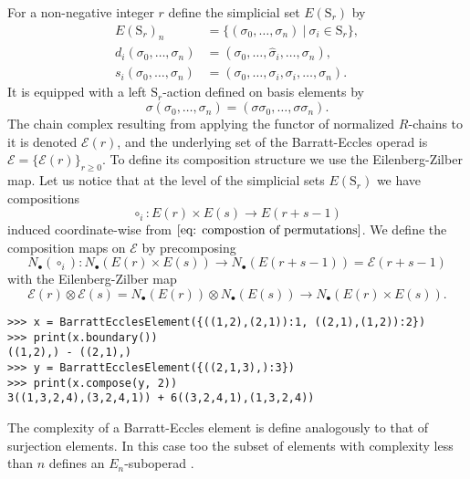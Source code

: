 \documentclass{amsart}
\renewcommand{\S}{\mathrm S}
\begin{document}
For a non-negative integer $r$ define the simplicial set $E(\mathrm S_r)$ by
\begin{align*}
E(\mathrm S_r)_n &= \{ (\sigma_0, \dots, \sigma_n)\ |\ \sigma_i \in \mathrm{S}_r\}, \\
d_i(\sigma_0, \dots, \sigma_n) &= (\sigma_0, \dots, \widehat{\sigma}_i, \dots, \sigma_n), \\
s_i(\sigma_0, \dots, \sigma_n) &= (\sigma_0, \dots, \sigma_i, \sigma_i, \dots, \sigma_n).
\end{align*}
It is equipped with a left $\mathrm S_r$-action defined on basis elements by
\begin{equation*}
\sigma (\sigma_0, \dots, \sigma_n) = (\sigma \sigma_0, \dots, \sigma \sigma_n).
\end{equation*}
The chain complex resulting from applying the functor of normalized $R$-chains to it is denoted $\mathcal E(r)$, and the underlying set of the Barratt-Eccles operad is $\mathcal E = \{\mathcal E(r)\}_{r\geq0}$. To define its composition structure we use the Eilenberg-Zilber map. Let us notice that at the level of the simplicial sets $E(\S_r)$ we have compositions
\begin{equation*}
{\circ}_{i}: E(r) \times E(s) \to E(r + s - 1)
\end{equation*}
induced coordinate-wise from $\eqref{eq: compostion of permutations}$.
We define the composition maps on $\mathcal E$ by precomposing
\begin{equation*}
N_\bullet(\circ_i) \colon N_\bullet(E(r) \times E(s))
\longrightarrow
N_\bullet(E(r + s - 1)) = \mathcal E(r+s-1)
\end{equation*}
with the Eilenberg-Zilber map
\begin{equation*}
\mathcal E(r) \otimes \mathcal E(s) =
N_\bullet(E(r)) \otimes N_\bullet(E(s))
\longrightarrow
N_\bullet(E(r) \times E(s)).
\end{equation*}
\begin{Verbatim}[frame=single]
>>> x = BarrattEcclesElement({((1,2),(2,1)):1, ((2,1),(1,2)):2})
>>> print(x.boundary())
((1,2),) - ((2,1),)
>>> y = BarrattEcclesElement({((2,1,3),):3})
>>> print(x.compose(y, 2))
3((1,3,2,4),(3,2,4,1)) + 6((3,2,4,1),(1,3,2,4))
\end{Verbatim}

The complexity of a Barratt-Eccles element is define analogously to that of surjection elements. In this case too the subset of elements with complexity less than $n$ defines an $E_n$-suboperad \cite{BergerFresse04}.
\end{document}
